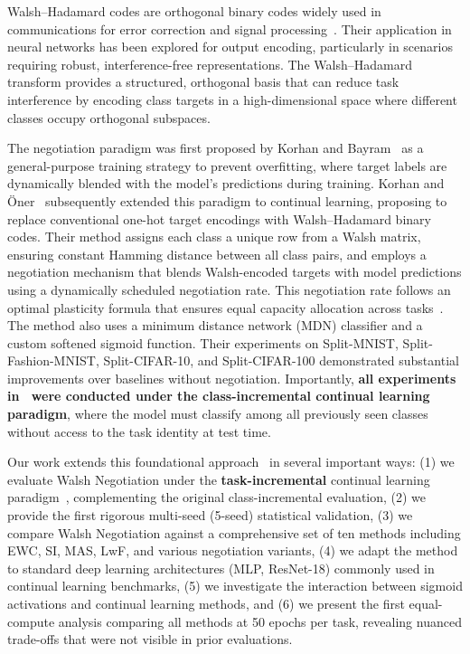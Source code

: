 \documentclass[preprint,review,12pt]{elsarticle}
\begin{document}
Walsh--Hadamard codes are orthogonal binary codes widely used in communications for error correction and signal processing~\cite{olmez2021walsh}. Their application in neural networks has been explored for output encoding, particularly in scenarios requiring robust, interference-free representations. The Walsh--Hadamard transform provides a structured, orthogonal basis that can reduce task interference by encoding class targets in a high-dimensional space where different classes occupy orthogonal subspaces.

The negotiation paradigm was first proposed by Korhan and Bayram~\cite{korhan2023negotiation_paradigm} as a general-purpose training strategy to prevent overfitting, where target labels are dynamically blended with the model's predictions during training. Korhan and {\"O}ner~\cite{korhan2023negotiated} subsequently extended this paradigm to continual learning, proposing to replace conventional one-hot target encodings with Walsh--Hadamard binary codes. Their method assigns each class a unique row from a Walsh matrix, ensuring constant Hamming distance between all class pairs, and employs a negotiation mechanism that blends Walsh-encoded targets with model predictions using a dynamically scheduled negotiation rate. This negotiation rate follows an optimal plasticity formula that ensures equal capacity allocation across tasks~\cite{korhan2023negotiated}. The method also uses a minimum distance network (MDN) classifier and a custom softened sigmoid function. Their experiments on Split-MNIST, Split-Fashion-MNIST, Split-CIFAR-10, and Split-CIFAR-100 demonstrated substantial improvements over baselines without negotiation. Importantly, \textbf{all experiments in~\cite{korhan2023negotiated} were conducted under the class-incremental continual learning paradigm}, where the model must classify among all previously seen classes without access to the task identity at test time.

Our work extends this foundational approach~\cite{korhan2023negotiated} in several important ways: (1) we evaluate Walsh Negotiation under the \textbf{task-incremental} continual learning paradigm~\cite{van2019three}, complementing the original class-incremental evaluation, (2) we provide the first rigorous multi-seed (5-seed) statistical validation, (3) we compare Walsh Negotiation against a comprehensive set of ten methods including EWC, SI, MAS, LwF, and various negotiation variants, (4) we adapt the method to standard deep learning architectures (MLP, ResNet-18) commonly used in continual learning benchmarks, (5) we investigate the interaction between sigmoid activations and continual learning methods, and (6) we present the first equal-compute analysis comparing all methods at 50 epochs per task, revealing nuanced trade-offs that were not visible in prior evaluations.
\end{document}
